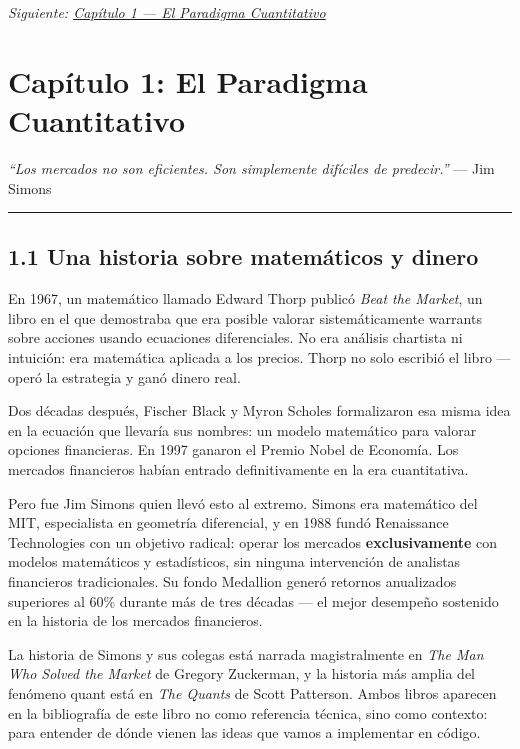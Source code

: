 \documentclass[12pt, a4paper, twoside, openright]{book}
\renewenvironment{quote}{%
  \begin{mdframed}[style=quotestyle]%
  \itshape\color{bkblue}%
}{%
  \end{mdframed}%
}
\numberwithin{figure}{chapter}
\numberwithin{table}{chapter}
\begin{document}
\emph{Siguiente: \href{capitulo_01_paradigma_cuantitativo.md}{Capítulo 1
--- El Paradigma Cuantitativo}}

\chapter{Capítulo 1: El Paradigma
Cuantitativo}\label{capuxedtulo-1-el-paradigma-cuantitativo}

\begin{quote}
\emph{``Los mercados no son eficientes. Son simplemente difíciles de
predecir.''} --- Jim Simons
\end{quote}

\begin{center}\rule{0.5\linewidth}{0.5pt}\end{center}

\section{1.1 Una historia sobre matemáticos y
dinero}\label{una-historia-sobre-matemuxe1ticos-y-dinero}

En 1967, un matemático llamado Edward Thorp publicó \emph{Beat the
Market}, un libro en el que demostraba que era posible valorar
sistemáticamente warrants sobre acciones usando ecuaciones
diferenciales. No era análisis chartista ni intuición: era matemática
aplicada a los precios. Thorp no solo escribió el libro --- operó la
estrategia y ganó dinero real.

Dos décadas después, Fischer Black y Myron Scholes formalizaron esa
misma idea en la ecuación que llevaría sus nombres: un modelo matemático
para valorar opciones financieras. En 1997 ganaron el Premio Nobel de
Economía. Los mercados financieros habían entrado definitivamente en la
era cuantitativa.

Pero fue Jim Simons quien llevó esto al extremo. Simons era matemático
del MIT, especialista en geometría diferencial, y en 1988 fundó
Renaissance Technologies con un objetivo radical: operar los mercados
\textbf{exclusivamente} con modelos matemáticos y estadísticos, sin
ninguna intervención de analistas financieros tradicionales. Su fondo
Medallion generó retornos anualizados superiores al 60\% durante más de
tres décadas --- el mejor desempeño sostenido en la historia de los
mercados financieros.

La historia de Simons y sus colegas está narrada magistralmente en
\emph{The Man Who Solved the Market} de Gregory Zuckerman, y la historia
más amplia del fenómeno quant está en \emph{The Quants} de Scott
Patterson. Ambos libros aparecen en la bibliografía de este libro no
como referencia técnica, sino como contexto: para entender de dónde
vienen las ideas que vamos a implementar en código.
\end{document}
